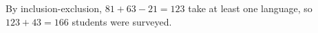 By inclusion-exclusion, $81+63-21=123$ take at least one language, so $123+43=\boxed{166}$ students were surveyed.
